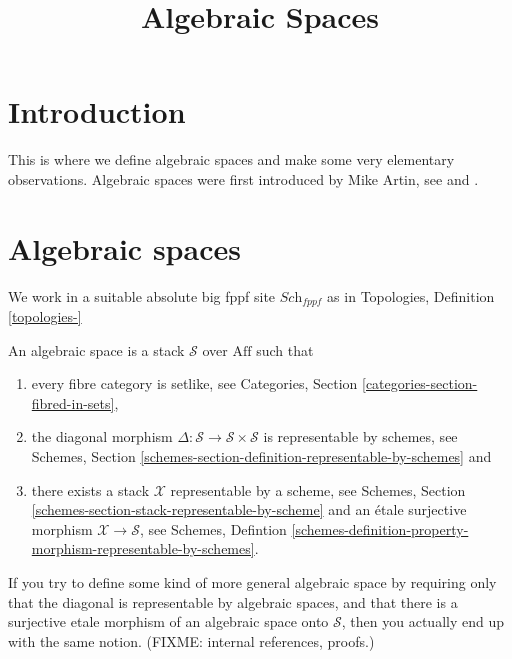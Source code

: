 

%


\title{Algebraic Spaces}


\maketitle

\tableofcontents

\section{Introduction}
\label{section-introduction}

\noindent
This is where we define algebraic spaces and make some very elementary
observations. Algebraic spaces were first introduced by Mike Artin,
see \cite{ArtinI} and \cite{ArtinII}.

\section{Algebraic spaces}
\label{section-algebraic-spaces}

\noindent
We work in a suitable absolute big fppf site $\textit{Sch}_{fppf}$
as in Topologies, Definition \ref{topologies-}

\begin{definition}
An algebraic space is a stack $\mathcal{S}$ over $\text{Aff}$ such that
\begin{enumerate}
\item every fibre category is setlike, see Categories,
Section \ref{categories-section-fibred-in-sets}, 
\item the diagonal morphism
$\Delta : \mathcal{S} \to \mathcal{S}\times\mathcal{S}$
is representable by schemes, see Schemes, Section
\ref{schemes-section-definition-representable-by-schemes} and
\item there exists a stack $\mathcal{X}$ representable by a scheme, see
Schemes, Section \ref{schemes-section-stack-representable-by-scheme}
and an \'etale surjective morphism $\mathcal{X} \to \mathcal{S}$,
see Schemes, Defintion
\ref{schemes-definition-property-morphism-representable-by-schemes}.
\end{enumerate}
\end{definition}

\begin{remark}
\label{remark-definition-correct}
If you try to define some kind of more general algebraic space by requiring
only that the diagonal is representable by algebraic spaces, and that there is
a surjective etale morphism of an algebraic space onto $\mathcal{S}$, then 
you actually end up with the same notion.
(FIXME: internal references, proofs.)
\end{remark}

